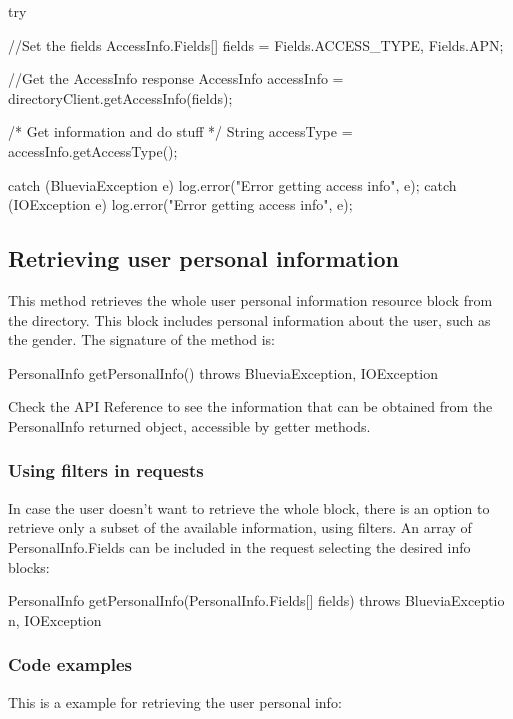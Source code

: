 \begin{DoxyCode}
try {
        //Set the fields
        AccessInfo.Fields[] fields = {Fields.ACCESS_TYPE, Fields.APN};
        
        //Get the AccessInfo response
        AccessInfo accessInfo = directoryClient.getAccessInfo(fields);

        /* Get information and do stuff */
        String accessType = accessInfo.getAccessType();
          
} catch (BlueviaException e) {
        log.error("Error getting access info", e);
} catch (IOException e) {
        log.error("Error getting access info", e);
}
\end{DoxyCode}
\hypertarget{blv_directory_guide_retrieving_user_personal_info_sec}{}\subsection{Retrieving user personal information}\label{blv_directory_guide_retrieving_user_personal_info_sec}
This method retrieves the whole user personal information resource block from the directory. This block includes personal information about the user, such as the gender. The signature of the method is:


\begin{DoxyCode}
PersonalInfo getPersonalInfo() throws BlueviaException, IOException
\end{DoxyCode}


Check the API Reference to see the information that can be obtained from the PersonalInfo returned object, accessible by getter methods.\hypertarget{blv_directory_guide_user_personal_info_using_filters_sec}{}\subsubsection{Using filters in requests}\label{blv_directory_guide_user_personal_info_using_filters_sec}
In case the user doesn't want to retrieve the whole block, there is an option to retrieve only a subset of the available information, using filters. An array of PersonalInfo.Fields can be included in the request selecting the desired info blocks:


\begin{DoxyCode}
PersonalInfo getPersonalInfo(PersonalInfo.Fields[] fields) throws BlueviaExceptio
      n, IOException
\end{DoxyCode}
\hypertarget{blv_directory_guide_user_personal_info_code_examples_sec}{}\subsubsection{Code examples}\label{blv_directory_guide_user_personal_info_code_examples_sec}
This is a example for retrieving the user personal info:


